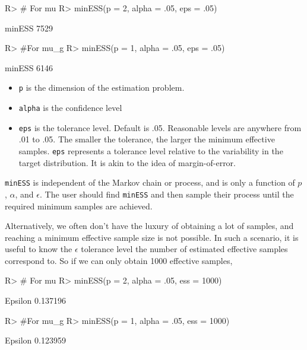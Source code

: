 \documentclass[11pt]{article}
\begin{document}
\begin{Schunk}
\begin{Sinput}
R> # For mu
R> minESS(p = 2, alpha = .05, eps = .05)
\end{Sinput}
\begin{Soutput}
minESS 
  7529 
\end{Soutput}
\begin{Sinput}
R> #For mu_g
R> minESS(p = 1, alpha = .05, eps = .05)
\end{Sinput}
\begin{Soutput}
minESS 
  6146 
\end{Soutput}
\end{Schunk}

\begin{itemize}
\item \texttt{p} is the dimension of the estimation problem.
\item \texttt{alpha} is the confidence level
\item \texttt{eps} is the tolerance level. Default is .05. Reasonable levels are anywhere from .01 to .05. The smaller the tolerance, the larger the minimum effective samples. \texttt{eps} represents a tolerance level relative to the variability in the target distribution. It is akin to the idea of margin-of-error.
\end{itemize}

\texttt{minESS} is independent of the Markov chain or process, and is only a function of $p$, $\alpha$, and $\epsilon$. The user should find \texttt{minESS} and then sample their process until the required minimum samples are achieved. 

Alternatively, we often don't have the luxury of obtaining a lot of samples, and reaching a minimum effective sample size is not possible. In such a scenario, it is useful to know the $\epsilon$ tolerance level the number of estimated effective samples correspond to. So if we can only obtain 1000 effective samples,
\begin{Schunk}
\begin{Sinput}
R> # For mu
R> minESS(p = 2, alpha = .05, ess = 1000)
\end{Sinput}
\begin{Soutput}
 Epsilon 
0.137196 
\end{Soutput}
\begin{Sinput}
R> #For mu_g
R> minESS(p = 1, alpha = .05, ess = 1000)
\end{Sinput}
\begin{Soutput}
 Epsilon 
0.123959 
\end{Soutput}
\end{Schunk}
\end{document}
